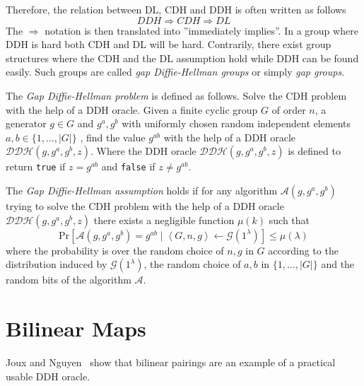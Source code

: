 Therefore, the relation between DL, CDH and DDH is often written as follows
\begin{equation*}
 DDH \Rightarrow CDH \Rightarrow DL
\end{equation*}
The $\Rightarrow$ notation is then translated into ''immediately implies''. In a group where DDH is hard both CDH and DL will be hard. Contrarily, there exist group structures where the CDH and the DL assumption hold while DDH can be found easily. Such groups are called \textit{gap Diffie-Hellman groups} or simply \textit{gap groups}.

\newpage
\begin{defn}[GDH]
\label{def:gdh}
The \textit{Gap Diffie-Hellman problem} is defined as follows. Solve the CDH problem with the help of a DDH oracle. Given a finite cyclic group $G$ of order $n$, a generator $g \in G$ and $g^a, g^b$ with uniformly chosen random independent elements $a, b \in \{ 1, \ldots, | G |\}$ , find the value $g^{ab}$ with the help of a DDH oracle $\mathcal{DDH} \left( g, g^a, g^b, z \right)$. Where the DDH oracle $\mathcal{DDH} \left( g, g^a, g^b, z \right)$ is defined to return \texttt{true} if $z = g^{ab}$ and \texttt{false} if $z \neq g^{ab}$.

The \textit{Gap Diffie-Hellman assumption} holds if for any algorithm $\mathcal{A} \left( g, g^a, g^b \right)$ trying to solve the CDH problem with the help of a DDH oracle $\mathcal{DDH} \left( g, g^a, g^b, z \right)$ there exists a negligible function $\mu \left( k \right)$ such that 
 \begin{equation*}
  \textrm{Pr} \left[ \mathcal{A} \left( g, g^a, g^b \right) = g^{ab} \mid \left< G, n, g \right> \leftarrow \mathcal{G} \left( 1^{\lambda} \right)\right] \leq \mu \left( \lambda \right)
 \end{equation*}
 where the probability is over the random choice of $n, g$ in $G$ according to the distribution induced by $\mathcal{G} \left( 1^{\lambda} \right)$, the random choice of $a, b$ in $\{ 1, \ldots, | G |\}$ and the random bits of the algorithm $\mathcal{A}$.
\end{defn}

\section{Bilinear Maps}
\label{sec:bilinear_map}

Joux and Nguyen~\cite{art:JouxN03} show that bilinear pairings are an example of a practical usable DDH oracle.

